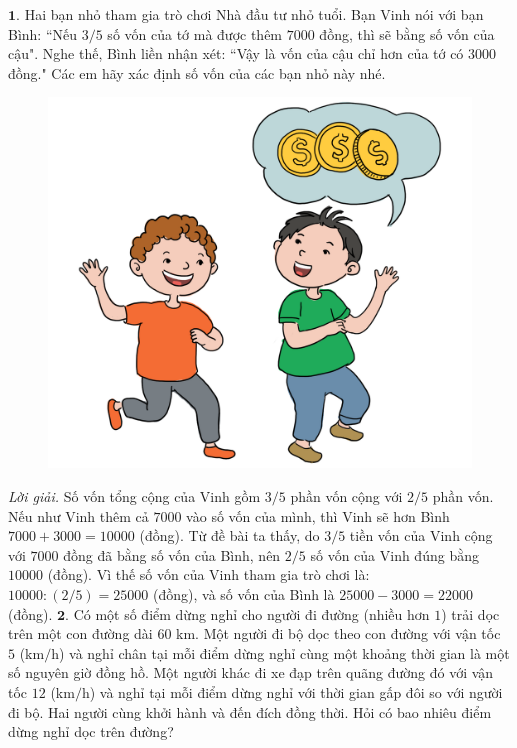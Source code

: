 \begin{multicols}{2}
	$\pmb{1.}$ Hai bạn nhỏ tham gia trò chơi Nhà đầu tư nhỏ tuổi. Bạn Vinh nói với bạn Bình: ``Nếu $3/5$ số vốn của tớ mà được thêm $7000$ đồng, thì sẽ bằng số vốn của cậu". Nghe thế, Bình liền  nhận xét: ``Vậy là vốn của cậu chỉ hơn của tớ có $3000$ đồng." Các em hãy xác định số vốn của các bạn nhỏ này nhé.
	\begin{figure}[H]
		\vspace*{-10pt}
		\centering
		\captionsetup{labelformat= empty, justification=centering}
		\includegraphics[width= 1\linewidth]{bai1}
	\end{figure}
	\textit{Lời giải.} Số vốn tổng cộng của Vinh gồm $3/5$ phần vốn cộng với $2/5$ phần vốn. Nếu như Vinh thêm cả $7000$ vào số vốn của mình, thì Vinh  sẽ hơn Bình  $7000+3000= 10000$ (đồng). Từ đề bài ta thấy, do $3/5$ tiền vốn của Vinh cộng với $7000$ đồng đã bằng số vốn của Bình, nên $2/5$ số vốn của Vinh đúng bằng $10000$ (đồng). Vì thế số vốn của Vinh tham gia trò chơi là: $10000: (2/5)= 25000$ (đồng), và số vốn của Bình là $25000-3000=22000$ (đồng).
	\vskip 0.1cm
	$\pmb{2.}$ Có một số điểm dừng nghỉ cho người đi đường (nhiều hơn $1$) trải dọc trên một con đường dài $60$ km. Một người đi bộ dọc theo con đường với vận tốc $5$ (km$/$h) và nghỉ chân tại mỗi điểm dừng nghỉ cùng một khoảng thời gian là một số nguyên giờ đồng hồ. Một người khác đi xe đạp trên quãng đường đó với vận tốc $12$ (km$/$h) và nghỉ tại mỗi điểm dừng nghỉ với thời gian gấp đôi so với người đi bộ. Hai người cùng khởi hành và đến đích đồng thời. Hỏi có bao nhiêu điểm dừng nghỉ dọc trên đường?

\end{multicols}
